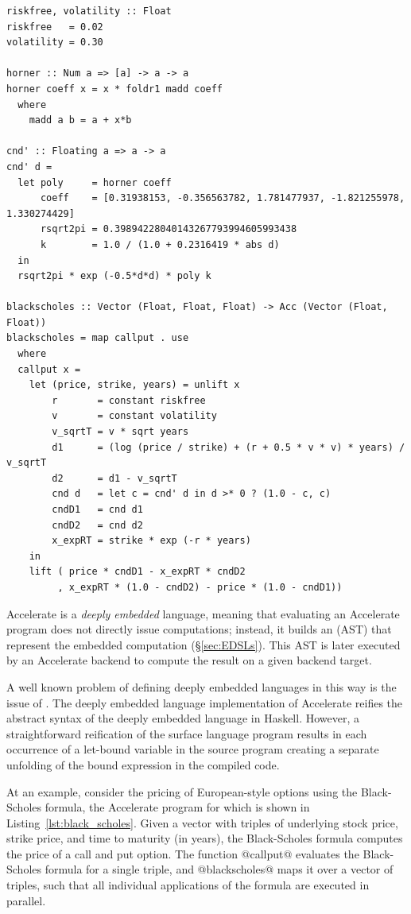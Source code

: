 \begin{lstlisting}[style=haskell_float
    ,float=t
    ,label=lst:black_scholes
    ,caption={Black-Scholes option pricing in Accelerate}]
riskfree, volatility :: Float
riskfree   = 0.02
volatility = 0.30

horner :: Num a => [a] -> a -> a
horner coeff x = x * foldr1 madd coeff
  where
    madd a b = a + x*b

cnd' :: Floating a => a -> a
cnd' d =
  let poly     = horner coeff
      coeff    = [0.31938153, -0.356563782, 1.781477937, -1.821255978, 1.330274429]
      rsqrt2pi = 0.39894228040143267793994605993438
      k        = 1.0 / (1.0 + 0.2316419 * abs d)
  in
  rsqrt2pi * exp (-0.5*d*d) * poly k

blackscholes :: Vector (Float, Float, Float) -> Acc (Vector (Float, Float))
blackscholes = map callput . use
  where
  callput x =
    let (price, strike, years) = unlift x
        r       = constant riskfree
        v       = constant volatility
        v_sqrtT = v * sqrt years
        d1      = (log (price / strike) + (r + 0.5 * v * v) * years) / v_sqrtT
        d2      = d1 - v_sqrtT
        cnd d   = let c = cnd' d in d >* 0 ? (1.0 - c, c)
        cndD1   = cnd d1
        cndD2   = cnd d2
        x_expRT = strike * exp (-r * years)
    in
    lift ( price * cndD1 - x_expRT * cndD2
         , x_expRT * (1.0 - cndD2) - price * (1.0 - cndD1))
\end{lstlisting}

Accelerate is a \emph{deeply embedded} language, meaning that evaluating an
Accelerate program does not directly issue computations; instead, it builds an
 (AST) that represent the embedded computation
(\S\ref{sec:EDSLs}). This AST is later executed by an Accelerate backend to
compute the result on a given backend target.

A well known problem of defining deeply embedded languages in this way is the
issue of . The deeply embedded language implementation of
Accelerate reifies the abstract syntax of the deeply embedded language in
Haskell. However, a straightforward reification of the surface language program
results in each occurrence of a let-bound variable in the source program
creating a separate unfolding of the bound expression in the compiled code.

At an example, consider the pricing of European-style options using the Black-Scholes formula, the
Accelerate program for which is shown in Listing~\ref{lst:black_scholes}. Given a vector with
triples of underlying stock price, strike price, and time to maturity (in years), the Black-Scholes
formula computes the price of a call and put option. The function @callput@ evaluates the
Black-Scholes formula for a single triple, and @blackscholes@ maps it over a vector of triples,
such that all individual applications of the formula are executed in parallel.

